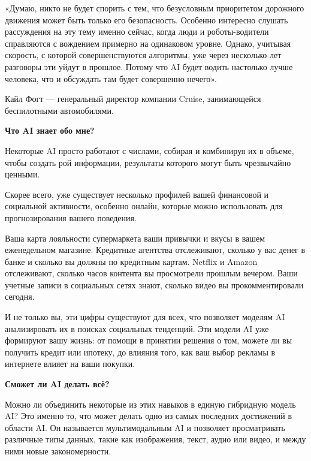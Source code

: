 \begin{fancyquotes}
    «Думаю, никто не будет спорить с тем, что безусловным приоритетом дорожного движения может быть только его безопасность. Особенно интересно слушать рассуждения на эту тему именно сейчас, когда люди и роботы-водители справляются с вождением примерно на одинаковом уровне. Однако, учитывая скорость, с которой совершенствуются алгоритмы, уже через несколько лет разговоры эти уйдут в прошлое. Потому что AI будет водить настолько лучше человека, что и обсуждать там будет совершенно нечего».\\

    \begin{flushright}
        Кайл Фогт — генеральный директор компании Cruise, занимающейся беспилотными автомобилями.
    \end{flushright}
\end{fancyquotes}

\textbf{Что AI знает обо мне?}

Некоторые AI просто работают с числами, собирая и комбинируя их в объеме, чтобы создать рой информации, результаты которого могут быть чрезвычайно ценными.

Скорее всего, уже существует несколько профилей вашей финансовой и социальной активности, особенно онлайн, которые можно использовать для прогнозирования вашего поведения.

Ваша карта лояльности супермаркета  ваши привычки и вкусы в вашем еженедельном магазине. Кредитные агентства отслеживают, сколько у вас денег в банке и сколько вы должны по кредитным картам. Netflix и Amazon отслеживают, сколько часов контента вы просмотрели прошлым вечером. Ваши учетные записи в социальных сетях знают, сколько видео вы прокомментировали сегодня.

И не только вы, эти цифры существуют для всех, что позволяет моделям AI анализировать их в поисках социальных тенденций. Эти модели AI уже формируют вашу жизнь: от помощи в принятии решения о том, можете ли вы получить кредит или ипотеку, до влияния того, как ваш выбор рекламы в интернете влияет на ваши покупки.


\textbf{Сможет ли AI делать всё?}

Можно ли объединить некоторые из этих навыков в единую гибридную модель AI? Это именно то, что может делать одно из самых последних достижений в области AI. Он называется мультимодальным AI и позволяет просматривать различные типы данных, такие как изображения, текст, аудио или видео, и  между ними новые закономерности.

